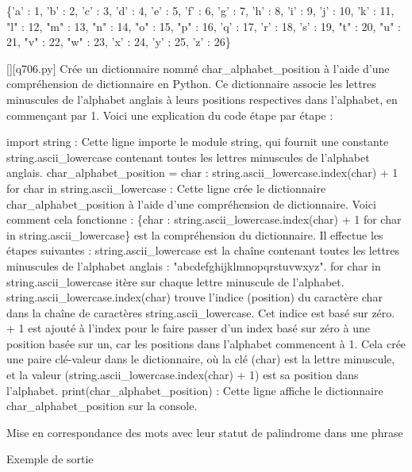 \{'a' : 1, 'b' : 2, 'c' : 3, 'd' : 4, 'e' : 5, 'f' : 6, 'g' : 7, 'h' : 8, 'i' : 9, 'j' : 10, 'k' : 11, "l" : 12, "m" : 13, "n" : 14, "o" : 15, "p" : 16, 'q' : 17, 'r' : 18, 's' : 19, "t" : 20, "u" : 21, "v" : 22, "w" : 23, 'x' : 24, 'y' : 25, 'z' : 26\}
        \par
        \begin{solution}
            \renewcommand{\nomfichier}{q706.py}
            \pythonfile{\chemincode \nomfichier}[][\nomfichier]
            Crée un dictionnaire nommé char\_alphabet\_position à l'aide d'une compréhension de dictionnaire en Python. Ce dictionnaire associe les lettres minuscules de l'alphabet anglais à leurs positions respectives dans l'alphabet, en commençant par 1. Voici une explication du code étape par étape :

    import string : Cette ligne importe le module string, qui fournit une constante string.ascii\_lowercase contenant toutes les lettres minuscules de l'alphabet anglais.
    char\_alphabet\_position = {char : string.ascii\_lowercase.index(char) + 1 for char in string.ascii\_lowercase} : Cette ligne crée le dictionnaire char\_alphabet\_position à l'aide d'une compréhension de dictionnaire. Voici comment cela fonctionne :
        \{char : string.ascii\_lowercase.index(char) + 1 for char in string.ascii\_lowercase\} est la compréhension du dictionnaire. Il effectue les étapes suivantes :
        string.ascii\_lowercase est la chaîne contenant toutes les lettres minuscules de l'alphabet anglais : "abcdefghijklmnopqrstuvwxyz".
        for char in string.ascii\_lowercase itère sur chaque lettre minuscule de l'alphabet.
        string.ascii\_lowercase.index(char) trouve l'indice (position) du caractère char dans la chaîne de caractères string.ascii\_lowercase. Cet indice est basé sur zéro.
        + 1 est ajouté à l'index pour le faire passer d'un index basé sur zéro à une position basée sur un, car les positions dans l'alphabet commencent à 1.
        Cela crée une paire clé-valeur dans le dictionnaire, où la clé (char) est la lettre minuscule, et la valeur (string.ascii\_lowercase.index(char) + 1) est sa position dans l'alphabet.
    print(char\_alphabet\_position) : Cette ligne affiche le dictionnaire char\_alphabet\_position sur la console.
        \end{solution}
        

        \question
        Mise en correspondance des mots avec leur statut de palindrome dans une phrase

Exemple de sortie

